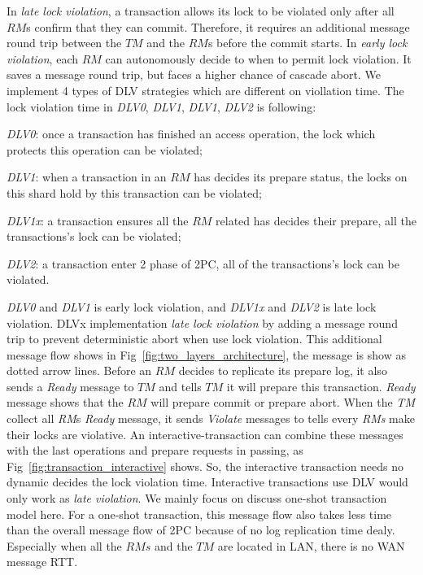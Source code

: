 \documentclass[conference]{IEEEtran}
\begin{document}
In \emph{late lock violation}, a transaction allows its lock to be violated only after all $RM$s confirm that they can commit.
Therefore, it requires an additional message round trip between the $TM$ and the $RM$s before the commit starts.
In \emph{early lock violation}, each $RM$ can autonomously decide to when to permit lock violation. 
It saves a message round trip, but faces a higher chance of cascade abort.
We implement 4 types of DLV strategies which are different on viollation time.
The lock violation time in \emph{DLV0}, \emph{DLV1}, \emph{DLV1}, \emph{DLV2} is following:

\emph{DLV0}: once a transaction has finished an access operation, the lock which protects this operation can be violated;

\emph{DLV1}: when a transaction in an ${RM}$ has decides its prepare status, the locks on this shard hold by this transaction can be violated;

\emph{DLV1x}: a transaction ensures all the ${RM}$ related has decides their prepare, all the transactions's lock can be violated;

\emph{DLV2}: a transaction enter 2 phase of 2PC, all of the transactions's lock can be violated.

\emph{DLV0} and \emph{DLV1} is early lock violation, and \emph{DLV1x} and \emph{DLV2} is late lock violation.
DLVx implementation \emph{late lock violation} by adding a message round trip to prevent deterministic abort when use lock violation.
This additional message flow shows in Fig~\ref{fig:two_layers_architecture}, the message is show as dotted arrow lines.
Before an ${RM}$ decides to replicate its prepare log, it also sends a \emph{Ready} message to ${TM}$ and tells ${TM}$ it will prepare this transaction.
\emph{Ready} message shows that the ${RM}$ will prepare commit or prepare abort.
When the \emph{TM} collect all \emph{RM}s \emph{Ready} message, it sends \emph{Violate} messages to tells every \emph{RMs} make their locks are violative.
An interactive-transaction can combine these messages with the last operations and prepare requests in passing, as Fig~\ref{fig:transaction_interactive} shows.
So, the interactive transaction needs no dynamic decides the lock violation time.
Interactive transactions use DLV would only work as \emph{late violation}.
We mainly focus on discuss one-shot transaction model here.
For a one-shot transaction, this message flow also takes less time than the overall message flow of 2PC because of no log replication time dealy.
Especially when all the ${RMs}$ and the ${TM}$ are located in LAN, there is no WAN message RTT.
\end{document}
